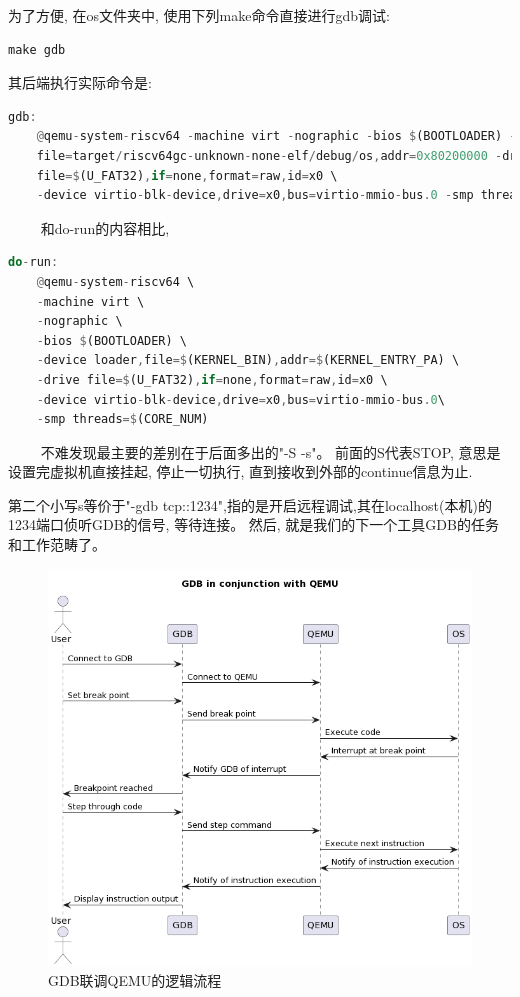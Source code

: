 为了方便, 在os文件夹中, 使用下列make命令直接进行gdb调试:
\begin{lstlisting}[language={Rust}, label={code:forktest},
	caption={forktest.rs}]
	make gdb
\end{lstlisting}
其后端执行实际命令是:
\begin{lstlisting}[language={Rust}, label={code:forktest},
	caption={forktest.rs}]
	gdb:
	@qemu-system-riscv64 -machine virt -nographic -bios $(BOOTLOADER) -device loader,\
	file=target/riscv64gc-unknown-none-elf/debug/os,addr=0x80200000 -drive \
	file=$(U_FAT32),if=none,format=raw,id=x0 \
	-device virtio-blk-device,drive=x0,bus=virtio-mmio-bus.0 -smp threads=$(CORE_NUM) -S -s
\end{lstlisting}  
和do-run的内容相比,
\begin{lstlisting}[language={Rust}, label={code:forktest},
	caption={forktest.rs}]
	do-run:
	@qemu-system-riscv64 \
	-machine virt \
	-nographic \
	-bios $(BOOTLOADER) \
	-device loader,file=$(KERNEL_BIN),addr=$(KERNEL_ENTRY_PA) \
	-drive file=$(U_FAT32),if=none,format=raw,id=x0 \
	-device virtio-blk-device,drive=x0,bus=virtio-mmio-bus.0\
	-smp threads=$(CORE_NUM)
\end{lstlisting}  
不难发现最主要的差别在于后面多出的"-S -s"。 前面的S代表STOP, 意思是设置完虚拟机直接挂起, 停止一切执行, 直到接收到外部的continue信息为止.

第二个小写s等价于"-gdb tcp::1234",指的是开启远程调试,其在localhost(本机)的1234端口侦听GDB的信号, 等待连接。 然后, 就是我们的下一个工具GDB的任务和工作范畴了。

\begin{figure}[htb]
\centering
\includegraphics[width=\textwidth]{figures/02-02-GDB联调QEMU的逻辑流程.png}
\caption{
	GDB联调QEMU的逻辑流程
}
\label{fig:GDB联调QEMU的逻辑流程}
\end{figure}

